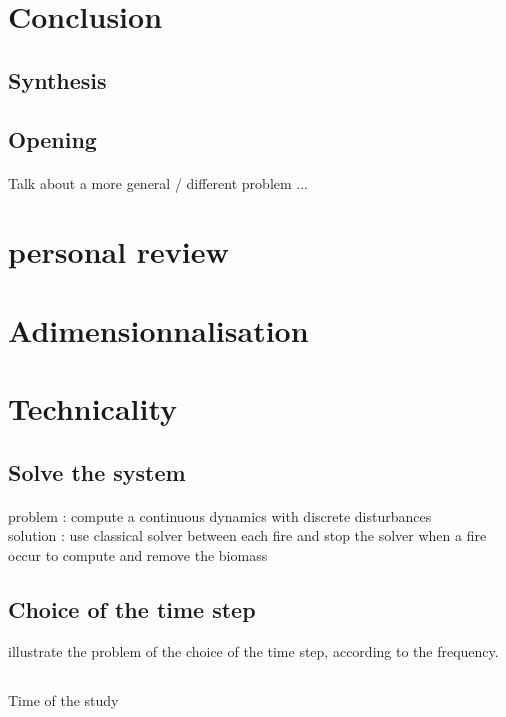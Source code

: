 \documentclass{article}
\begin{document}
\section*{Conclusion}


\subsection*{Synthesis}


\subsection*{Opening}

\paragraph{}
Talk about a more general / different problem ...


\newpage

\section*{personal review}


\newpage





\newpage
\appendix
{}

\newpage
\section{Adimensionnalisation}



\newpage
\section{Technicality}

\subsection{Solve the system}

\paragraph{}
problem : compute a continuous dynamics with discrete disturbances \\
solution : use classical solver between each fire and stop the solver when a fire occur to compute and remove the biomass


\subsection{Choice of the time step}
illustrate the problem of the choice of the time step, according to the frequency.

\subsection{}
Time of the study

\end{document}
